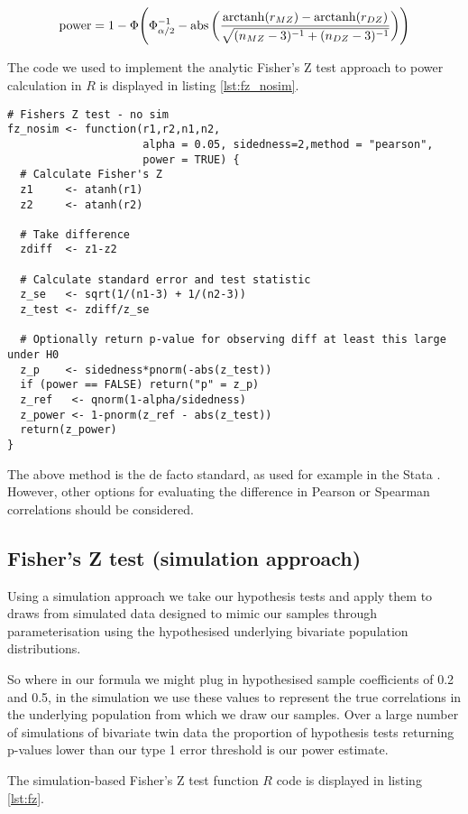$$ \operatorname{power} = 1- \Phi \Bigg(\Phi_{\alpha/2}^{-1} -  \operatorname{abs}\bigg(  \frac{\operatorname{arctanh}(r_{MZ}) - \operatorname{arctanh}(r_{DZ})}{\sqrt{(n_{MZ}-3)^{-1} + (n_{DZ}-3)^{-1}}}  \bigg)  \Bigg) $$ 

The code we used to implement the analytic Fisher's Z test approach to power calculation in $R$ is displayed in listing \ref{lst:fz_nosim}.

\begin{lstlisting}[float=h,caption={Fisher's Z test (analytic approach)},label={lst:fz_nosim}]
# Fishers Z test - no sim
fz_nosim <- function(r1,r2,n1,n2,
                     alpha = 0.05, sidedness=2,method = "pearson",
                     power = TRUE) {
  # Calculate Fisher's Z
  z1     <- atanh(r1)
  z2     <- atanh(r2)
  
  # Take difference
  zdiff  <- z1-z2
  
  # Calculate standard error and test statistic
  z_se   <- sqrt(1/(n1-3) + 1/(n2-3))
  z_test <- zdiff/z_se
  
  # Optionally return p-value for observing diff at least this large under H0
  z_p    <- sidedness*pnorm(-abs(z_test))
  if (power == FALSE) return("p" = z_p)
  z_ref   <- qnorm(1-alpha/sidedness)
  z_power <- 1-pnorm(z_ref - abs(z_test))
  return(z_power)
}
\end{lstlisting}

The above method is the de facto standard, as used for example in the Stata  \cite{StataCorp2013}.  However, other options for evaluating the difference in Pearson or Spearman correlations should be considered.  

\subsection{Fisher's Z test (simulation approach)}
Using a simulation approach we take our hypothesis tests and apply them to draws from simulated data designed to mimic our samples through parameterisation using the hypothesised underlying bivariate population distributions.  

So where in our formula we might plug in hypothesised sample coefficients of 0.2 and 0.5, in the simulation we use these values to represent the true correlations in the underlying population from which we draw our samples.  Over a large number of simulations of bivariate twin data the proportion of hypothesis tests returning p-values lower than our type 1 error threshold is our power estimate.

The simulation-based Fisher's Z test function $R$ code is displayed in listing \ref{lst:fz}.

